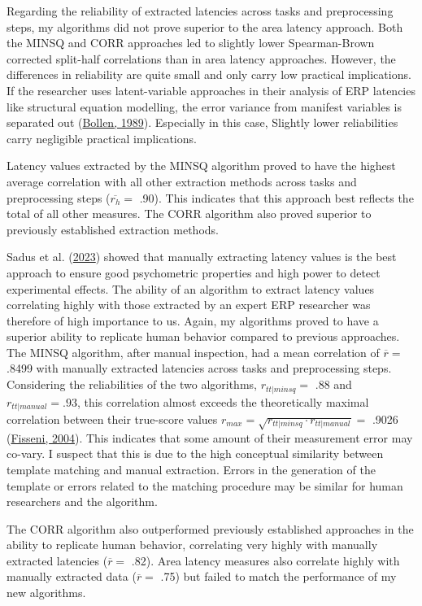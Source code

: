 \documentclass[
  man]{apa7}
\begin{document}
Regarding the reliability of extracted latencies across tasks and preprocessing steps, my algorithms did not prove superior to the area latency approach. Both the MINSQ and CORR approaches led to slightly lower Spearman-Brown corrected split-half correlations than in area latency approaches. However, the differences in reliability are quite small and only carry low practical implications. If the researcher uses latent-variable approaches in their analysis of ERP latencies like structural equation modelling, the error variance from manifest variables is separated out (\protect\hyperlink{ref-bollen1989structural}{Bollen, 1989}). Especially in this case, Slightly lower reliabilities carry negligible practical implications.

Latency values extracted by the MINSQ algorithm proved to have the highest average correlation with all other extraction methods across tasks and preprocessing steps (\(\overline{r_{h}} =\) .90). This indicates that this approach best reflects the total of all other measures. The CORR algorithm also proved superior to previously established extraction methods.

Sadus et al. (\protect\hyperlink{ref-sadus2023multiverse}{2023}) showed that manually extracting latency values is the best approach to ensure good psychometric properties and high power to detect experimental effects. The ability of an algorithm to extract latency values correlating highly with those extracted by an expert ERP researcher was therefore of high importance to us.
Again, my algorithms proved to have a superior ability to replicate human behavior compared to previous approaches. The MINSQ algorithm, after manual inspection, had a mean correlation of \(\overline{r} =\) .8499 with manually extracted latencies across tasks and preprocessing steps. Considering the reliabilities of the two algorithms, \(r_{tt|minsq} =\) .88 and \(r_{tt|manual} = .93\), this correlation almost exceeds the theoretically maximal correlation between their true-score values \(r_{max} = \sqrt{r_{tt|minsq} \cdot r_{tt|manual}} =\) .9026 (\protect\hyperlink{ref-fisseni2004lehrbuch}{Fisseni, 2004}). This indicates that some amount of their measurement error may co-vary. I suspect that this is due to the high conceptual similarity between template matching and manual extraction. Errors in the generation of the template or errors related to the matching procedure may be similar for human researchers and the algorithm.

The CORR algorithm also outperformed previously established approaches in the ability to replicate human behavior, correlating very highly with manually extracted latencies (\(\overline{r} =\) .82). Area latency measures also correlate highly with manually extracted data (\(\overline{r} =\) .75) but failed to match the performance of my new algorithms.
\end{document}

